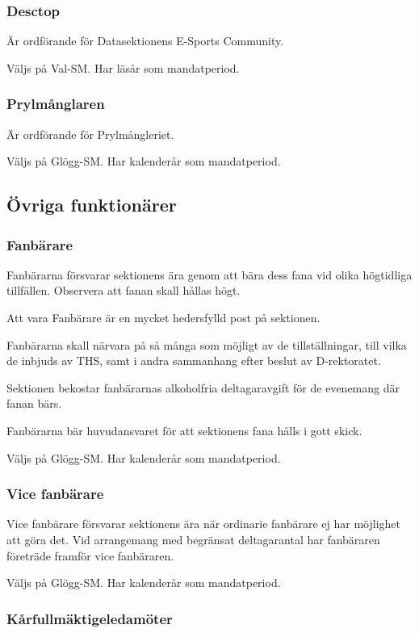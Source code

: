 \documentclass{dgovdoc}
\begin{document}
\subsubsection{Desctop}

Är ordförande för Datasektionens E-Sports Community.

Väljs på Val-SM. Har läsår som mandatperiod.

\subsubsection{Prylmånglaren}
Är ordförande för Prylmångleriet.

Väljs på Glögg-SM. Har kalenderår som mandatperiod.

\subsection{Övriga funktionärer}

\subsubsection{Fanbärare}

Fanbärarna försvarar sektionens ära genom att bära dess fana vid olika
högtidliga tillfällen. Observera att fanan skall hållas högt.

Att vara Fanbärare är en mycket hedersfylld post på sektionen.

Fanbärarna skall närvara på så många som möjligt av de tillställningar, till
vilka de inbjuds av THS, samt i andra sammanhang efter beslut av D-rektoratet.

Sektionen bekostar fanbärarnas alkoholfria deltagaravgift för de evenemang där
fanan bärs.

Fanbärarna bär huvudansvaret för att sektionens fana hålls i gott skick.

Väljs på Glögg-SM. Har kalenderår som mandatperiod.

\subsubsection{Vice fanbärare}

Vice fanbärare försvarar sektionens ära när ordinarie fanbärare ej har
möjlighet att göra det. Vid arrangemang med begränsat deltagarantal har
fanbäraren företräde framför vice fanbäraren.

Väljs på Glögg-SM. Har kalenderår som mandatperiod.

\subsubsection{Kårfullmäktigeledamöter}
\end{document}
